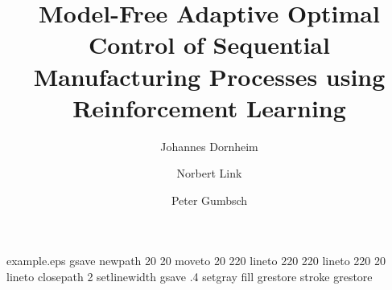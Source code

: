 %
%
%
%
%
\begin{filecontents*}{example.eps}
gsave
newpath
  20 20 moveto
  20 220 lineto
  220 220 lineto
  220 20 lineto
closepath
2 setlinewidth
gsave
  .4 setgray fill
grestore
stroke
grestore
\end{filecontents*}
%
\RequirePackage{fix-cm}
%
\documentclass[twocolumn]{svjour3}          %
%
\smartqed  %
%
\usepackage{graphicx}
%
%
\usepackage{epstopdf}
\usepackage{amsmath}
\usepackage{amssymb}
\usepackage{bm}
\usepackage{todonotes}
\usepackage{comment}
%
%
%


\title{Model-Free Adaptive Optimal Control of Sequential Manufacturing Processes using Reinforcement Learning}


\author{Johannes Dornheim         \and
        Norbert Link			   \and
        Peter Gumbsch
}



